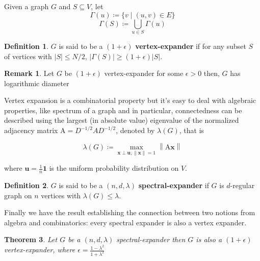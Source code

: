 \documentclass[10pt]{article}
\theoremstyle{plain}
\newtheorem{theorem}{Theorem}[section]
\theoremstyle{definition}
\newtheorem{definition}[theorem]{Definition}
\newtheorem*{remark}{Remark}
\newcommand{\norm}[1]{\left\lVert#1\right\rVert}
\begin{document}
Given a graph $G$ and $S \subseteq V$, let
$$\Gamma(u) \coloneqq \{v \mid (u,v) \in E\}$$
$$\Gamma(S) \coloneqq \bigcup_{u \in S} \Gamma(u)$$

\begin{definition}
$G$ is said to be a $(1+\epsilon)$ \textbf{vertex-expander} if for any subset $S$ of vertices with $|S| \leq N/2$, $|\Gamma(S)| \geq (1+\epsilon)|S|$.
\end{definition}

\begin{remark}
Let $G$ be $(1+\epsilon)$ vertex-expander for some $\epsilon > 0$ then, $G$ has logarithmic diameter
\end{remark}

Vertex expansion is a combinatorial property but it's easy to deal with algebraic properties, like spectrum of a graph and in particular, connectedness can be described using the largest (in absolute value) eigenvalue of the normalized adjacency matrix $\mathrm{A} = D^{-1/2}AD^{-1/2}$, denoted by $\lambda(G)$, that is

$$\lambda(G) \coloneqq \max_{\mathbf{x} \perp \mathbf{u}, \norm{\mathbf{x}}=1} \norm{\mathrm{A}\mathbf{x}}$$

where $\mathbf{u} = \frac1n \mathbf{1}$ is the uniform probability distribution on $V$.


\begin{definition}
$G$ is said to be a $(n,d,\lambda)$ \textbf{spectral-expander} if $G$ is $d$-regular graph on $n$ vertices with $\lambda(G) \leq \lambda$.
\end{definition}

Finally we have the result establishing the connection between two notions from algebra and combinatorics: every spectral expander is also a vertex expander.

\begin{theorem}
Let $G$ be a $(n,d,\lambda)$ spectral-expander then $G$ is also a $(1 + \epsilon)$ vertex-expander, where $\epsilon = \frac{1-\lambda^2}{1+\lambda^2}$
\end{theorem}
\end{document}
